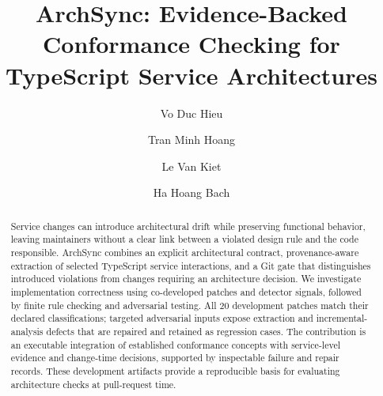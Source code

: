 \usepackage{array}
\acmDOI{}
\acmISBN{}

\title[ArchSync: Service Architecture Conformance]{ArchSync: Evidence-Backed Conformance Checking for TypeScript Service Architectures}
\author{Vo Duc Hieu}
\author{Tran Minh Hoang}
\author{Le Van Kiet}
\author{Ha Hoang Bach}
\renewcommand{\shortauthors}{Hieu et al.}
\begin{abstract}
Service changes can introduce architectural drift while preserving functional behavior, leaving maintainers without a clear link between a violated design rule and the code responsible. ArchSync combines an explicit architectural contract, provenance-aware extraction of selected TypeScript service interactions, and a Git gate that distinguishes introduced violations from changes requiring an architecture decision. We investigate implementation correctness using co-developed patches and detector signals, followed by finite rule checking and adversarial testing. All 20 development patches match their declared classifications; targeted adversarial inputs expose extraction and incremental-analysis defects that are repaired and retained as regression cases. The contribution is an executable integration of established conformance concepts with service-level evidence and change-time decisions, supported by inspectable failure and repair records. These development artifacts provide a reproducible basis for evaluating architecture checks at pull-request time.
\end{abstract}
